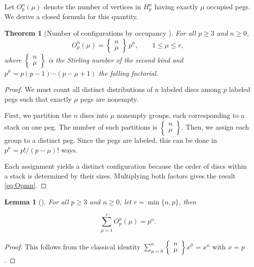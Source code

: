 \documentclass[letterpaper,12pt]{article}
\newtheorem{theorem}{Theorem}
\newtheorem{lemma}{Lemma}
\begin{document}
Let \(O_p^n(\mu)\) denote the number of vertices in \(H_p^n\) having exactly \(\mu\) occupied pegs.  
We derive a closed formula for this quantity.

\begin{theorem}[Number of configurations by occupancy \cite{klavzarcombinatorics,Arett01062010}]
\label{th:Opmn}
For all \(p\ge3\) and \(n\ge0\),
\begin{equation}
\label{eq:Opmn}
O_p^n(\mu)=\begin{Bmatrix} n \\ \mu \end{Bmatrix}\,p^{\underline{\mu}},
\qquad 1\le\mu\le r,
\end{equation}
where \(\begin{Bmatrix} n \\ \mu \end{Bmatrix}\) is the Stirling number of the second kind and \(p^{\underline{\mu}}=p(p-1)\cdots(p-\mu+1)\) the falling factorial.
\end{theorem}

\begin{proof}
We must count all distinct distributions of \(n\) labeled discs among \(p\) labeled pegs such that exactly \(\mu\) pegs are nonempty.

First, we partition the \(n\) discs into \(\mu\) nonempty groups, each corresponding to a stack on one peg.  
The number of such partitions is \(\begin{Bmatrix} n \\ \mu \end{Bmatrix}\).  
Then, we assign each group to a distinct peg.  
Since the pegs are labeled, this can be done in \(p^{\underline{\mu}}=p!/(p-\mu)!\) ways.

Each assignment yields a distinct configuration because the order of discs within a stack is determined by their sizes.  
Multiplying both factors gives the result \eqref{eq:Opmn}.
\end{proof}


 

\begin{lemma}[\cite{klavzarcombinatorics}]\label{lem:sum-O=pn}
For all \(p\ge3\) and \(n\ge0\), let $r = \min\{n,p\}$, then  

\begin{equation}
    \sum_{\mu=1}^{r} O_p^n(\mu) = p^n.
\end{equation}
\end{lemma}

\begin{proof}
This follows from the classical identity
\(\sum_{\mu=0}^n \begin{Bmatrix} n \\ \mu \end{Bmatrix}x^{\underline{\mu}} = x^n\)
with \(x=p\).
\end{proof}
\end{document}
